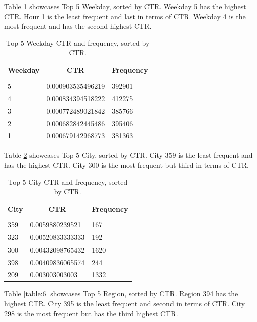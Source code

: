 \documentclass{article} %
\begin{document}
Table \ref{table:4} showcases Top 5 Weekday, sorted by CTR. Weekday 5 has the highest CTR. Hour 1 is the least frequent and last in terms of CTR. Weekday 4 is the most frequent and has the second highest CTR.

\begin{table}[!htbp]
\caption{Top 5 Weekday CTR and frequency, sorted by CTR.}
\label{table:4}
\begin{center}
\begin{tabular}{l l l}
\multicolumn{1}{c}{\bf Weekday} & \multicolumn{1}{c}{\bf CTR} & \multicolumn{1}{c}{\bf Frequency}
\\ \hline \\
5 & 0.000903535496219 & 392901\\
4 & 0.000834394518222 & 412275\\
3 & 0.000772489021842 & 385766\\
2 & 0.000682842445486 & 395406\\
1 & 0.000679142968773 & 381363\\
\end{tabular}
\end{center}
\end{table}

Table \ref{table:5} showcases Top 5 City, sorted by CTR. City 359 is the least frequent and has the highest CTR. City 300 is the most frequent but third in terms of CTR.

\begin{table}[!htbp]
\caption{Top 5 City CTR and frequency, sorted by CTR.}
\label{table:5}
\begin{center}
\begin{tabular}{l l l}
\multicolumn{1}{c}{\bf City} & \multicolumn{1}{c}{\bf CTR} & \multicolumn{1}{c}{\bf Frequency}
\\ \hline \\
359 & 0.0059880239521  & 167\\
323 & 0.00520833333333 & 192\\
300 & 0.00432098765432 & 1620\\
398 & 0.00409836065574 & 244\\
209 & 0.003003003003   & 1332\\
\end{tabular}
\end{center}
\end{table}

Table \ref{table:6} showcases Top 5 Region, sorted by CTR. Region 394 has the highest CTR. City 395 is the least frequent and second in terms of CTR. City 298 is the most frequent but has the third highest CTR.
\end{document}

